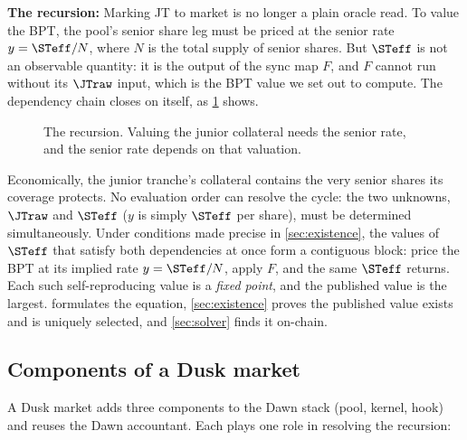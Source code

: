 \textbf{The recursion:} Marking JT to market is no longer a plain oracle
read. To value the BPT, the pool's senior share leg must be priced at
the senior rate $y = \STeff / N$, where $N$ is the total supply of senior shares.
But $\STeff$ is not an observable quantity: it is the output of the
sync map $F$, and $F$ cannot run without its $\JTraw$ input, which is
the BPT value we set out to compute. The dependency chain closes on
itself, as \cref{fig:recursion} shows.

\begin{figure}[!ht]
\centering
{}
\caption{The recursion. Valuing the junior collateral needs the senior
rate, and the senior rate depends on that valuation.}
\label{fig:recursion}
\end{figure}

Economically, the junior tranche's collateral contains the very senior
shares its coverage protects. No evaluation order can resolve the cycle:
the two unknowns, $\JTraw$ and $\STeff$ ($y$ is simply $\STeff$ per
share), must be determined simultaneously. Under conditions made
precise in \cref{sec:existence}, the values of $\STeff$ that satisfy
both dependencies at once form a contiguous block: price the BPT at its
implied rate $y = \STeff/N$, apply $F$, and the same $\STeff$ returns.
Each such self-reproducing value is a \emph{fixed point}, and the
published value is the largest. 
formulates the equation, \cref{sec:existence} proves the published
value exists and is uniquely selected, and \cref{sec:solver} finds it
on-chain.

\subsection{Components of a Dusk market}
\label{sec:overview:pieces}

A Dusk market adds three components to the Dawn stack (pool, kernel,
hook) and reuses the Dawn accountant. Each plays one role in resolving
the recursion:

